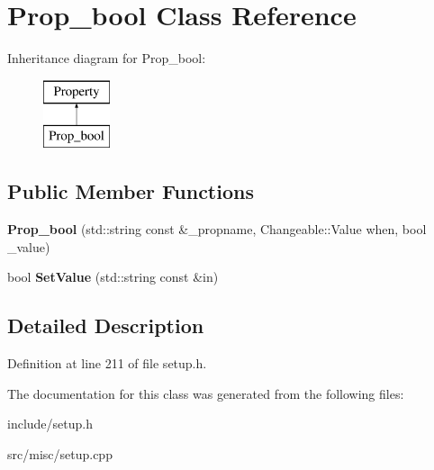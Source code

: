 \hypertarget{classProp__bool}{\section{Prop\-\_\-bool Class Reference}
\label{classProp__bool}
}
Inheritance diagram for Prop\-\_\-bool\-:\begin{figure}[H]
\begin{center}
\leavevmode
\includegraphics[height=2.000000cm]{classProp__bool}
\end{center}
\end{figure}
\subsection*{Public Member Functions}
\begin{DoxyCompactItemize}
\item 
\hypertarget{classProp__bool_ab70b5efc7550776962b20ecc1fd329ca}{{\bfseries Prop\-\_\-bool} (std\-::string const \&\-\_\-propname, Changeable\-::\-Value when, bool \-\_\-value)}\label{classProp__bool_ab70b5efc7550776962b20ecc1fd329ca}

\item 
\hypertarget{classProp__bool_aed3bf08dc9a6f2973d7e24cc6407796a}{bool {\bfseries Set\-Value} (std\-::string const \&in)}\label{classProp__bool_aed3bf08dc9a6f2973d7e24cc6407796a}

\end{DoxyCompactItemize}


\subsection{Detailed Description}


Definition at line 211 of file setup.\-h.



The documentation for this class was generated from the following files\-:\begin{DoxyCompactItemize}
\item 
include/setup.\-h\item 
src/misc/setup.\-cpp\end{DoxyCompactItemize}
